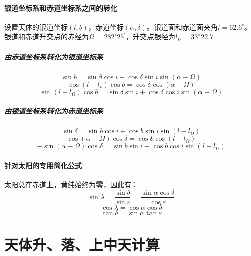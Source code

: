 \paragraph{银道坐标系和赤道坐标系之间的转化}
设置天体的银道坐标$(l,b)$，赤道坐标$(\alpha,\delta)$。银道面和赤道面夹角$i=62.6^\circ$。银道和赤道升交点的赤经为$\Omega =282^\circ25^\prime$，升交点银经为$l_{\Omega}=33^\circ22.7^\prime$
\subparagraph{由赤道坐标系转化为银道坐标系}
\begin{equation}
	\sin b=\sin \delta \cos i-\cos\delta \sin i \sin (\alpha-\Omega)
\end{equation}
\begin{equation}
	\cos (l-l_{b})\cos b=\cos \delta \cos (\alpha-\Omega)
\end{equation}
\begin{equation}
	\sin(l-l_{\Omega})\cos b=\sin \delta \sin i+\cos \delta \cos i \sin (\alpha-\Omega)
\end{equation}
\subparagraph{由银道坐标系转化为赤道坐标系}
\begin{equation}
	\sin \delta =\sin b \cos i+\cos b \sin i\sin (l-l_{\Omega})
\end{equation}
\begin{equation}
	\cos (\alpha-\Omega)\cos \delta =\cos b\cos (l-l_{\Omega})
\end{equation}
\begin{equation}
	-\sin (\alpha-\Omega)\cos \delta=\sin b\sin i-\cos b\cos i\sin (l-l_{\Omega})
\end{equation}
\paragraph{针对太阳的专用简化公式}
太阳总在赤道上，黄纬始终为零，因此有：
\begin{equation}
	\sin \lambda =\frac{\sin \delta }{\sin \varepsilon}=\frac{\sin \alpha \cos \delta }{\cos \varepsilon}
\end{equation}
\begin{equation}
	\cos \lambda =\cos\alpha\cos \delta 
\end{equation}
\begin{equation}
	\tan \delta =\sin \alpha \tan \varepsilon
\end{equation}

\section{天体升、落、上中天计算}
